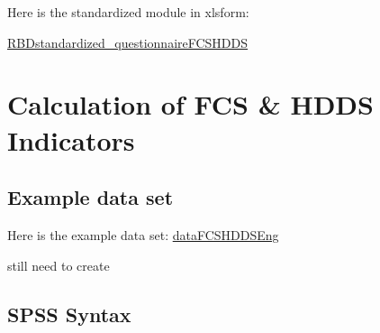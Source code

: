 \documentclass[
]{book}
\begin{document}
Here is the standardized module in xlsform:

\href{https://github.com/WFP-VAM/RBD_FS_CH_guide_EN/blob/master/questionnaires/RBDstandardized_questionnaireFCSHDDS.xlsx}{RBDstandardized\_questionnaireFCSHDDS}

\hypertarget{calculation-of-fcs-hdds-indicators}{%
\section{Calculation of FCS \& HDDS Indicators}\label{calculation-of-fcs-hdds-indicators}}

\hypertarget{example-data-set-2}{%
\subsection{Example data set}\label{example-data-set-2}}

Here is the example data set:
\href{https://github.com/WFP-VAM/RBD_FS_CH_guide_EN/blob/master/example_datasets/dataFCSHDDSEng.sav}{dataFCSHDDSEng}

still need to create

\hypertarget{spss-syntax-2}{%
\subsection{SPSS Syntax}\label{spss-syntax-2}}
\end{document}
